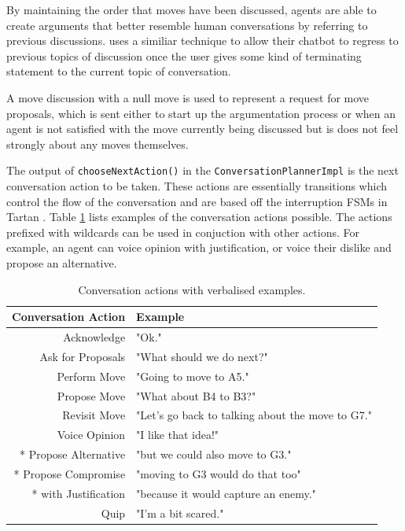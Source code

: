 \documentclass{article}
\begin{document}
By maintaining the order that moves have been discussed, agents are able to create arguments that better resemble human conversations by referring to previous discussions. \cite{tartan} uses a similiar technique to allow their chatbot to regress to previous topics of discussion once the user gives some kind of terminating statement to the current topic of conversation. 

A move discussion with a null move is used to represent a request for move proposals, which is sent either to start up the argumentation process or when an agent is not satisfied with the move currently being discussed but is does not feel strongly about any moves themselves.

The output of \lstinline{chooseNextAction()} in the \lstinline{ConversationPlannerImpl} is the next conversation action to be taken. These actions are essentially transitions which control the flow of the conversation and are based off the interruption FSMs in Tartan \cite{tartan}. Table \ref{tbl:conversationaction} lists examples of the conversation actions possible. The actions prefixed with wildcards can be used in conjuction with other actions. For example, an agent can voice opinion with justification, or voice their dislike and propose an alternative. 

\begin{table} 
\centering
\caption{Conversation actions with verbalised examples.} 
\label{tbl:conversationaction}
\begin{tabular}{ r|l } 
	Conversation Action & Example \\
 \hline
	Acknowledge & "Ok." \\ 
	Ask for Proposals & "What should we do next?" \\ 
	Perform Move & "Going to move to A5." \\ 
	Propose Move & "What about B4 to B3?" \\ 
	Revisit Move & "Let's go back to talking about the move to G7." \\ 
	Voice Opinion & "I like that idea!" \\ 
	* Propose Alternative & "but we could also move to G3." \\ 
	* Propose Compromise & "moving to G3 would do that too"  \\ 
	* with Justification & "because it would capture an enemy."  \\ 
	Quip & "I'm a bit scared."  \\ 
 \hline
\end{tabular}
\end{table}
\end{document}
